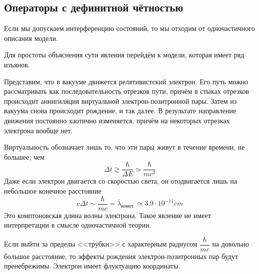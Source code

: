 \subsection{Операторы с дефинитной чётностью}
Если мы допускаем интерференцию состояний, то мы отходим от одночастичного описания модели.

Для простоты объяснения сути явления перейдём к модели, которая имеет ряд изъянов.

Представим, что в вакууме движется релятивистский электрон. Его путь можно рассматривать как последовательность отрезков пути, причём в стыках отрезков происходит аннигиляция виртуальной электрон-позитронной пары. Затем из вакуума снова происходит рождение, и так далее. В результате направление движения постоянно хаотично изменяется, причём на некоторых отрезках электрона вообще нет.

Виртуальность обозначает лишь то, что эти пары живут в течение времени, не большее, чем
$$
    \Delta t \gtrsim \dfrac{\hbar}{\Delta E} \simeq \dfrac{\hbar}{mc^2}
$$ 
Даже если электрон двигается со скоростью света, он отодвигается лишь на небольшое конечное расстояние
$$
    c \Delta t \sim \dfrac{\hbar}{mc} = \bar \lambda_{\text{компт.}} \simeq 3.9 \cdot 10^{-11} cm
$$
Это комптоновская длина волны электрона. Такое явление не имеет интерпретации в смысле одночастичной теории.

Если выйти за пределы <<трубки>> с характерным радиусом $\dfrac{\hbar}{mc}$ на довольно большое расстояние, то эффекты рождения электрон-позитронных пар будут пренебрежимы. Электрон имеет флуктуацию координаты.

% 